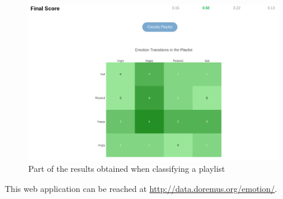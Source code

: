 \begin{figure}
  \centering
  \includegraphics[width=1.0\textwidth]{./chapters/appendix1/images/demo-final-result}
  \caption{Part of the results obtained when classifying a playlist}
  \label{fig:demo-final-result}
\end{figure}

This web application can be reached at \url{http://data.doremus.org/emotion/}.
